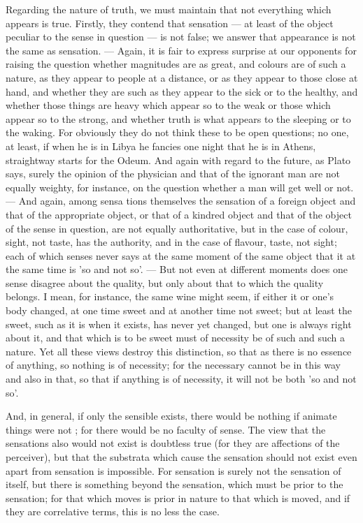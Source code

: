 Regarding the nature of truth, we must maintain that not everything which appears is true. Firstly, they contend that sensation — at least of the object peculiar to the sense in question — is not false; we answer that appearance is not the same as sensation. — Again, it is fair to express surprise at our opponents for raising the question whether magnitudes are as great, and colours are of such a nature, as they appear to people at a distance, or as they appear to those close at hand, and whether they are such as they appear to the sick or to the healthy, and whether those things are heavy which appear so to the weak or those which appear so to the strong, and whether truth is what appears to the sleeping or to the waking. For obviously they do not think these to be open questions; no one, at least, if when he is in Libya he fancies one night that he is in Athens, straightway starts for the Odeum. And again with regard to the future, as Plato says, surely the opinion of the physician and that of the ignorant man are not equally weighty, for instance, on the question whether a man will get well or not. — And again, among sensa tions themselves the sensation of a foreign object and that of the appropriate object, or that of a kindred object and that of the object of the sense in question, are not equally authoritative, but in the case of colour, sight, not taste, has the authority, and in the case of flavour, taste, not sight; each of which senses never says at the same moment of the same object that it at the same time is 'so and not so'. — But not even at different moments does one sense disagree about the quality, but only about that to which the quality belongs. I mean, for instance, the same wine might seem, if either it or one's body changed, at one time sweet and at another time not sweet; but at least the sweet, such as it is when it exists, has never yet changed, but one is always right about it, and that which is to be sweet must of necessity be of such and such a nature. Yet all these views destroy this distinction, so that as there is no essence of anything, so nothing is of necessity; for the necessary cannot be in this way and also in that, so that if anything is of necessity, it will not be both 'so and not so'.

And, in general, if only the sensible exists, there would be nothing if animate things were not ; for there would be no faculty of sense. The view that the sensations also would not exist is doubtless true (for they are affections of the perceiver), but that the substrata which cause the sensation should not exist even apart from sensation is impossible. For sensation is surely not the sensation of itself, but there is something beyond the sensation, which must be prior to the sensation; for that which moves is prior in nature to that which is moved, and if they are correlative terms, this is no less the case.

